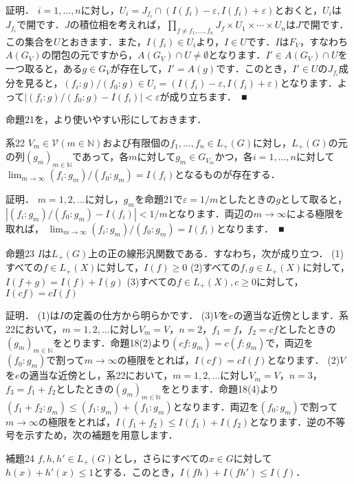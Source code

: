 証明．
$i=1, \ldots , n$に対し，$U_i=J_{f_i} \cap ( I(f_i)- \varepsilon, I(f_i)+\varepsilon )$とおくと，$U_i$は$J_{f_i}$で開です．$J$の積位相を考えれば，$\prod_{f \neq f_1, \ldots , f_n}J_f \times U_1 \times \cdots \times U_n$は$J$で開です．この集合を$U$とおきます．また，$I(f_i) \in U_i$より，$I \in U$です．$I$は$F_V$，すなわち$A(G_V)$の閉包の元ですから，$A(G_V) \cap U \neq \emptyset$となります．$I' \in A(G_V) \cap U$を一つ取ると，ある$g \in G_V$が存在して，$I'=A(g)$です．このとき，$I' \in U$の$J_{f_i}$成分を見ると，$(f_i \colon g ) / ( f_0 \colon g ) \in U_i = ( I(f_i)- \varepsilon, I(f_i)+\varepsilon )$となります．よって$|(f_i \colon g ) / ( f_0 \colon g ) -I(f_i) | < \varepsilon$が成り立ちます．　■

命題21を，より使いやすい形にしておきます．

系22
$V_m \in \mathscr{V}(m \in \mathbb{N})$および有限個の$f_1, \ldots , f_n \in L_{+}(G)$に対し，$L_{+}(G)$の元の列$(g_m)_{m \in \mathbb{N}}$であって，各$m$に対して$g_m \in G_{V_m}$かつ，各$i=1, \ldots , n$に対して $\lim_{m \to \infty} (f_i \colon g_m ) / ( f_0 \colon g_m ) =I(f_i)$となるものが存在する．

証明．
$m=1,2, \ldots$に対し，$g_m$を命題21で$\varepsilon = 1/m$としたときの$g$として取ると，$|(f_i \colon g_m ) / ( f_0 \colon g_m ) -I(f_i) | < 1/m$となります．両辺の$m \to \infty$による極限を取れば， $\lim_{m \to \infty} (f_i \colon g_m ) / ( f_0 \colon g_m ) =I(f_i)$となります．　■

命題23
$I$は$L_{+}(G)$上の正の線形汎関数である．すなわち，次が成り立つ．
(1)すべての$f \in L_{+}(X)$に対して，$I(f) \ge 0$
(2)すべての$f,g \in L_{+}(X)$に対して，$I(f+g)=I(f)+I(g)$
(3)すべての$f \in L_{+}(X), c \ge 0$に対して，$I(cf)=cI(f)$

証明．
(1)は$I$の定義の仕方から明らかです．
(3)$V$を$e$の適当な近傍とします．系22において，$m=1,2,\ldots$に対し$V_m=V$，$n=2$，$f_1=f$，$f_2=cf$としたときの$(g_m)_{m \in \mathbb{N}}$をとります．命題18(2)より$(cf \colon g_m)=c(f \colon g_m)$で，両辺を$(f_0 \colon g_m)$で割って$m \to \infty$の極限をとれば，$I(cf)=cI(f)$となります．
(2)$V$を$e$の適当な近傍とし，系22において，$m=1,2,\ldots$に対し$V_m=V$，$n=3$，$f_3=f_1+f_2$としたときの$(g_m)_{m \in \mathbb{N}}$をとります．命題18(4)より$(f_{1}+f_{2} \colon g_m ) \le (f_1 \colon g_m )+(f_1 \colon g_m)$となります．両辺を$(f_0 \colon g_m)$で割って$m \to \infty$の極限をとれば，$I(f_1+f_2) \le I(f_1)+I(f_2)$となります．逆の不等号を示すため，次の補題を用意します．

補題24
$f, h, h'\in L_{+}(G)$とし，さらにすべての$x \in G$に対して$h(x)+h'(x) \le 1$とする．このとき，$I(fh)+I(fh') \le I(f)$．

